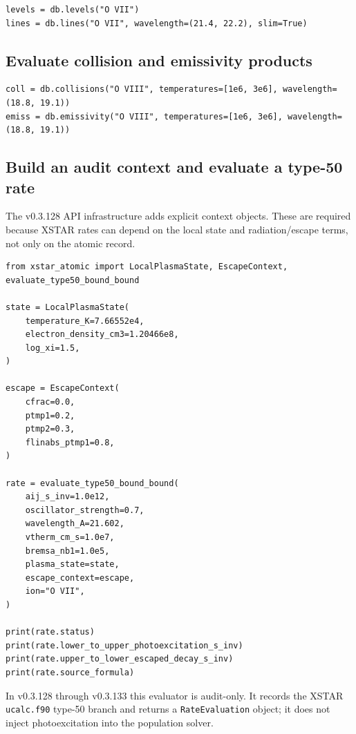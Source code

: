 \documentclass[11pt]{article}
\begin{document}
\begin{lstlisting}[style=ctpython]
levels = db.levels("O VII")
lines = db.lines("O VII", wavelength=(21.4, 22.2), slim=True)
\end{lstlisting}

\subsection{Evaluate collision and emissivity products}

\begin{lstlisting}[style=ctpython]
coll = db.collisions("O VIII", temperatures=[1e6, 3e6], wavelength=(18.8, 19.1))
emiss = db.emissivity("O VIII", temperatures=[1e6, 3e6], wavelength=(18.8, 19.1))
\end{lstlisting}

\subsection{Build an audit context and evaluate a type-50 rate}

The v0.3.128 API infrastructure adds explicit context objects. These are required because XSTAR rates can depend on the local state and radiation/escape terms, not only on the atomic record.

\begin{lstlisting}[style=ctpython]
from xstar_atomic import LocalPlasmaState, EscapeContext, evaluate_type50_bound_bound

state = LocalPlasmaState(
    temperature_K=7.66552e4,
    electron_density_cm3=1.20466e8,
    log_xi=1.5,
)

escape = EscapeContext(
    cfrac=0.0,
    ptmp1=0.2,
    ptmp2=0.3,
    flinabs_ptmp1=0.8,
)

rate = evaluate_type50_bound_bound(
    aij_s_inv=1.0e12,
    oscillator_strength=0.7,
    wavelength_A=21.602,
    vtherm_cm_s=1.0e7,
    bremsa_nb1=1.0e5,
    plasma_state=state,
    escape_context=escape,
    ion="O VII",
)

print(rate.status)
print(rate.lower_to_upper_photoexcitation_s_inv)
print(rate.upper_to_lower_escaped_decay_s_inv)
print(rate.source_formula)
\end{lstlisting}

In v0.3.128 through v0.3.133 this evaluator is audit-only. It records the XSTAR \texttt{ucalc.f90} type-50 branch and returns a \texttt{RateEvaluation} object; it does not inject photoexcitation into the population solver.
\end{document}
